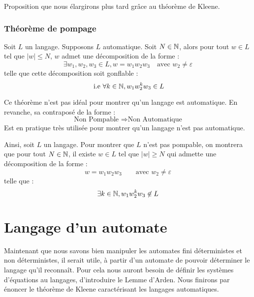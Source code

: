 Proposition que nous élargirons plus tard grâce au théorème de Kleene. 

\subsubsection{Théorème de pompage}

\begin{theorem}
    Soit $L$ un langage. Supposons $L$ automatique. 
    Soit $N \in \mathbb{N}$, alors pour tout $w \in L$ tel que $ |w| \leqslant N$, $w$ admet une décomposition 
    de la forme : 
        \[\exists w_1, w_2, w_3 \in L, w = w_1 w_2 w_3 \quad \text{avec } w_2 \not  = \varepsilon \]
    telle que cette décomposition soit gonflable :
        \[ \text{ i.e } \forall k \in \mathbb{N}, w_1 w_2 ^k w_3 \in L \]
\end{theorem} 

Ce théorème n'est pas idéal pour montrer qu'un langage est automatique. En revanche, sa contraposé de la forme :
    \[ \text{Non Pompable } \Longrightarrow \text{Non Automatique} \]  
Est en pratique très utilisée pour montrer qu'un langage n'est pas automatique. 

\begin{proposition}
    Ainsi, soit $L$ un langage. Pour montrer que $L$ n'est pas pompable, on montrera que 
    pour tout $N \in \mathbb{N}$, il existe $w \in L$ tel que $ |w| \geqslant N$ qui admette une décomposition de la forme : 
        \[ w = w_1 w_2 w_3 \quad \quad \text{avec } w_2 \not  = \varepsilon \] 
    telle que : 
        \[ \exists k \in \mathbb{N}, w_1 w_2^k w_3 \not \in L \] 
\end{proposition}



\section{Langage d'un automate}


Maintenant que nous savons bien manipuler les automates fini déterministes et non déterministes, il serait utile, 
à partir d'un automate de pouvoir déterminer le langage qu'il reconnaît. Pour cela nous auront besoin de définir 
les systèmes d'équations au langages, d'introduire le Lemme d'Arden. Nous finirons par énoncer le théorème de Kleene 
caractérisant les langages automatiques. 

